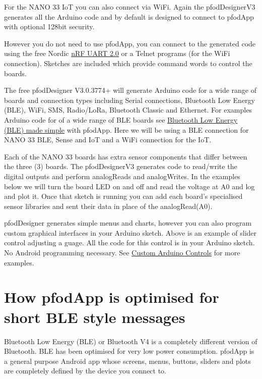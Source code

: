 For the NANO 33 IoT you can also connect via WiFi. Again the pfodDesignerV3 generates all the Arduino code and by default is designed to connect to pfodApp with optional 128bit security.
    
However you do not need to use pfodApp, you can connect to the generated code using the free Nordic \href{https://play.google.com/store/apps/details?id=com.nordicsemi.nrfUARTv2&hl=en}{nRF UART 2.0} or a Telnet programs (for the WiFi connection). Sketches are included which provide command words to control the boards.
    
The free pfodDesigner V3.0.3774+ will generate Arduino code for a wide range of boards and connection types including Serial connections, Bluetooth Low Energy (BLE), WiFi, SMS, Radio/LoRa, Bluetooth Classic and Ethernet. For examples Arduino code for of a wide range of BLE boards see \href{https://www.forward.com.au/pfod/BLE/index.html}{Bluetooth Low Energy (BLE) made simple} with pfodApp. Here we will be using a BLE connection for NANO 33 BLE, Sense and IoT and a WiFi connection for the IoT.
    
Each of the NANO 33 boards has extra sensor components that differ between the three (3) boards. The pfodDesignerV3 generates code to read/write the digital outputs and perform analogReads and analogWrites. In the examples below we will turn the board LED on and off and read the voltage at A0 and log and plot it. Once that sketch is running you can add each board's specialised sensor libraries and sent their data in place of the analogRead(A0).
    
pfodDesigner generates simple menus and charts, however you can also program custom graphical interfaces in your Arduino sketch. Above is an example of slider control adjusting a guage. All the code for this control is in your Arduino sketch. No Android programming necessary. See \href{https://www.forward.com.au/pfod/pfodControls/index.html}{Custom Arduino Controls} for more examples.
    
\section{How pfodApp is optimised for short BLE style messages}

Bluetooth Low Energy (BLE) or Bluetooth V4 is a completely different version of Bluetooth. BLE has been optimised for very low power consumption. pfodApp is a general purpose Android app whose screens, menus, buttons, sliders and plots are completely defined by the device you connect to.
    

